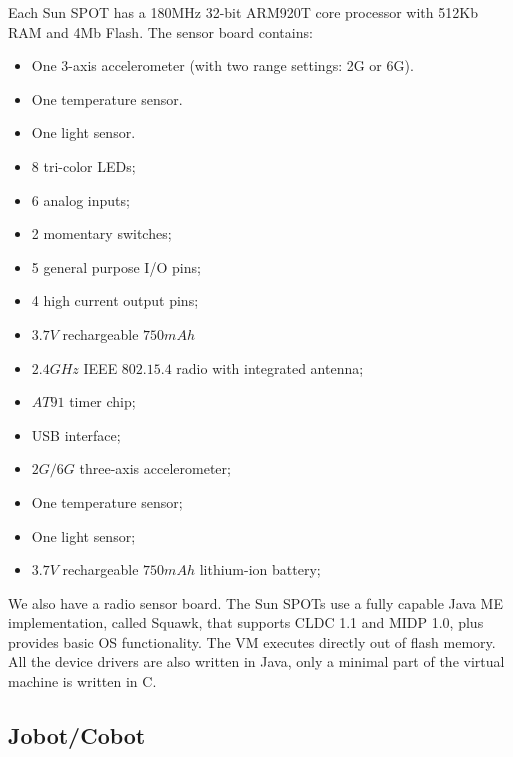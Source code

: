 \documentclass[a4paper,10pt]{article} %
\begin{document}
Each Sun SPOT has a 180MHz 32-bit ARM920T core processor with 512Kb RAM and 4Mb
Flash. The sensor board contains:

\begin{itemize}
    \item One 3-axis accelerometer (with two range settings: 2G or 6G).
    \item One temperature sensor.
    \item One light sensor.
    \item 8 tri-color LEDs;
    \item 6 analog inputs;
    \item 2 momentary switches;
    \item 5 general purpose I/O pins;
    \item 4 high current output pins;
    \item $3.7V$ rechargeable $750 mAh$
    \item $2.4 GHz$ IEEE $802.15.4$ radio with integrated antenna;
    \item $AT91$ timer chip;
    \item USB interface;
    \item $2G/6G$ three-axis accelerometer;
    \item One temperature sensor;
    \item One light sensor;
    \item $3.7V$ rechargeable $750 mAh$ lithium-ion battery;
\end{itemize}

We also have a radio sensor board. The Sun SPOTs use a fully capable Java ME
implementation, called Squawk, that supports CLDC 1.1 and MIDP 1.0, plus
provides basic OS functionality. The VM executes directly out of flash memory.
All the device drivers are also written in Java, only a minimal part of the
virtual machine is written in C.


\subsection{Jobot/Cobot} %
\label{app:cobot}
\end{document}
